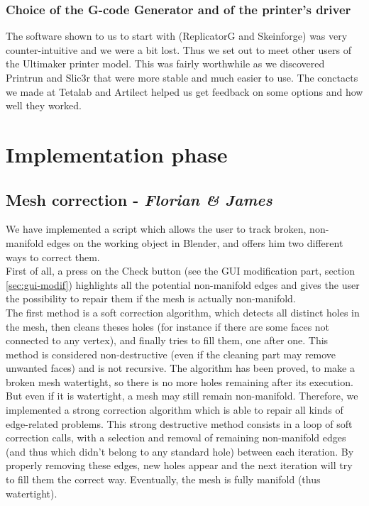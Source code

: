 \documentclass{report}
\begin{document}
\subsection{Choice of the G-code Generator and of the printer's driver}
The software shown to us to start with (ReplicatorG and Skeinforge) was very counter-intuitive and we were a bit lost. Thus we set out to meet other users of the Ultimaker printer model. This was fairly worthwhile as we discovered Printrun and Slic3r that were more stable and much easier to use. The conctacts we made at Tetalab and Artilect helped us get feedback on some options and how well they worked.

\chapter{Implementation phase}

\section{Mesh correction - \textit{Florian \& James}}

We have implemented a script which allows the user to track broken, non-manifold edges on the working object in Blender, and offers him two different ways to correct them.\\

First of all, a press on the Check button (see the GUI modification part, section \ref{sec:gui-modif}) highlights all the potential non-manifold edges and gives the user the possibility to repair them if the mesh is actually non-manifold.\\

The first method is a soft correction algorithm, which detects all distinct holes in the mesh, then cleans theses holes (for instance if there are some faces not connected to any vertex), and finally tries to fill them, one after one. This method is considered non-destructive (even if the cleaning part may remove unwanted faces) and is not recursive. The algorithm has been proved, to make a broken mesh watertight, so there is no more holes remaining after its execution.\\

But even if it is watertight, a mesh may still remain non-manifold. Therefore, we implemented a strong correction algorithm which is able to repair all kinds of edge-related problems. This strong destructive method consists in a loop of soft correction calls, with a selection and removal of remaining non-manifold edges (and thus which didn't belong to any standard hole) between each iteration. By properly removing these edges, new holes appear and the next iteration will try to fill them the correct way. Eventually, the mesh is fully manifold (thus watertight).\\
\end{document}
